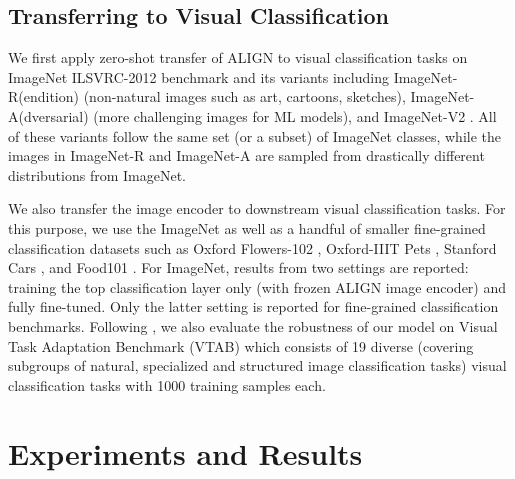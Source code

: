 \documentclass{article}
\begin{document}
\subsection{Transferring to Visual Classification}

We first apply zero-shot transfer of ALIGN to visual classification tasks on ImageNet ILSVRC-2012 benchmark \cite{deng:imagenet} and its variants including ImageNet-R(endition) \cite{imagenet-r} (non-natural images such as art, cartoons, sketches), ImageNet-A(dversarial) \cite{imagenet-a} (more challenging images for ML models), and ImageNet-V2 \cite{imagenet-v2}. All of these variants follow the same set (or a subset) of ImageNet classes, while the images in ImageNet-R and ImageNet-A are sampled from drastically different distributions from ImageNet.

We also transfer the image encoder to downstream visual classification tasks. For this purpose, we use the  ImageNet as well as a handful of smaller fine-grained classification datasets such as Oxford Flowers-102 \cite{nilsback:flowers}, Oxford-IIIT Pets \cite{parkhi:pets}, Stanford Cars \cite{krause:cars196}, and Food101 \cite{bossard:food101}. For ImageNet, results from two settings are reported: training the top classification layer only (with frozen ALIGN image encoder) and fully fine-tuned. Only the latter setting is reported for fine-grained classification benchmarks. Following \citet{kolensnikov:bit}, we also evaluate the robustness of our model on Visual Task Adaptation Benchmark (VTAB) \cite{zhai:vtab} which consists of 19 diverse (covering subgroups of natural, specialized and structured image classification tasks) visual classification tasks with 1000 training samples each. 
\vspace{-0.3cm}
\section{Experiments and Results}\label{sec:experiment_result}
\end{document}
